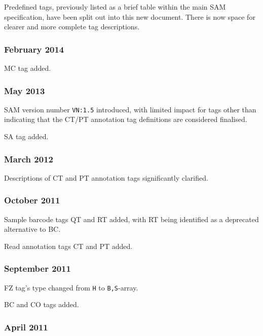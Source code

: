 \documentclass[10pt]{article}
\begin{document}
\begin{appendices}
Predefined tags, previously listed as a brief table within the main SAM specification, have been split out into this new document.
There is now space for clearer and more complete tag descriptions.

\subsubsection*{February 2014}

MC tag added.

\subsubsection*{May 2013}

SAM version number {\tt VN:1.5} introduced, with limited impact for tags other than indicating that the CT/PT annotation tag definitions are considered finalised.

\gap
SA tag added.

\subsubsection*{March 2012}

Descriptions of CT and PT annotation tags significantly clarified.

\subsubsection*{October 2011}

Sample barcode tags QT and RT added, with RT being identified as a deprecated alternative to BC.

Read annotation tags CT and PT added.

\subsubsection*{September 2011}

FZ tag's type changed from {\tt H} to {\tt B,S}-array.

BC and CO tags added.

\subsubsection*{April 2011}


\end{appendices}
\end{document}
